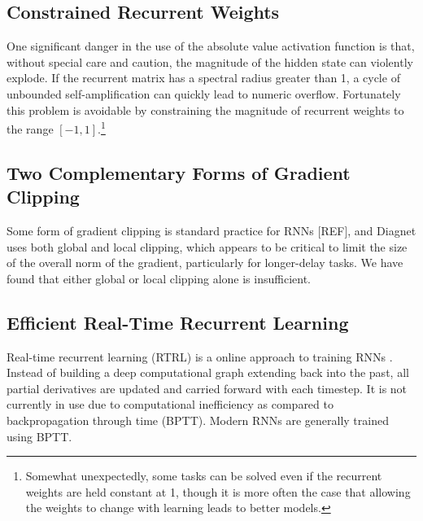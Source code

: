 \documentclass{article}
\begin{document}

\subsection{Constrained Recurrent Weights}

One significant danger in the use of the absolute value activation function is that, without special care and caution, the magnitude of the hidden state can violently explode. If the recurrent matrix has a spectral radius greater than 1, a cycle of unbounded self-amplification can quickly lead to numeric overflow. Fortunately this problem is avoidable by constraining the magnitude of recurrent weights to the range $\left [-1, 1 \right ]$.\footnote{Somewhat unexpectedly, some tasks can be solved even if the recurrent weights are held constant at 1, though it is more often the case that allowing the weights to change with learning leads to better models.
}





\subsection{Two Complementary Forms of Gradient Clipping}

Some form of gradient clipping is standard practice for RNNs [REF], and Diagnet uses both global and local clipping, which appears to be critical to limit the size of the overall norm of the gradient, particularly for longer-delay tasks. We have found that either global or local clipping alone is insufficient.

\subsection{Efficient Real-Time Recurrent Learning}

Real-time recurrent learning (RTRL) is a online approach to training RNNs \citep{RTRL}. Instead of building a deep computational graph extending back into the past, all partial derivatives are updated and carried forward with each timestep. It is not currently in use due to computational inefficiency as compared to backpropagation through time (BPTT). Modern RNNs are generally trained using BPTT. 
\end{document}
